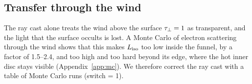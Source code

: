 \subsection{Transfer through the wind}
\label{sec:spectrum:transfer}

The ray cast alone treats the wind above the surface $\tau_\perp = 1$ as transparent, and the light that the surface occults is lost.
A Monte Carlo of electron scattering through the wind shows that this makes $L_{\rm iso}$ too low inside the funnel, by a factor of 1.5--2.4, and too high and too hard beyond its edge, where the hot inner disc stays visible (Appendix~\ref{app:mc}).
We therefore correct the ray cast with a table of Monte Carlo runs (switch  = 1).

